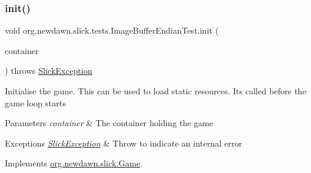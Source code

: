 \subsubsection{\texorpdfstring{init()}{init()}}
{\footnotesize\ttfamily void org.\+newdawn.\+slick.\+tests.\+Image\+Buffer\+Endian\+Test.\+init (\begin{DoxyParamCaption}\item[{\mbox{\hyperlink{classorg_1_1newdawn_1_1slick_1_1_game_container}{Game\+Container}}}]{container }\end{DoxyParamCaption}) throws \mbox{\hyperlink{classorg_1_1newdawn_1_1slick_1_1_slick_exception}{Slick\+Exception}}\hspace{0.3cm}{\ttfamily [inline]}}

Initialise the game. This can be used to load static resources. It\textquotesingle{}s called before the game loop starts


\begin{DoxyParams}{Parameters}
{\em container} & The container holding the game \\
\hline
\end{DoxyParams}

\begin{DoxyExceptions}{Exceptions}
{\em \mbox{\hyperlink{classorg_1_1newdawn_1_1slick_1_1_slick_exception}{Slick\+Exception}}} & Throw to indicate an internal error \\
\hline
\end{DoxyExceptions}


Implements \mbox{\hyperlink{interfaceorg_1_1newdawn_1_1slick_1_1_game_ad2dd6affab08bb8fdb5fab0815957b7a}{org.\+newdawn.\+slick.\+Game}}.


